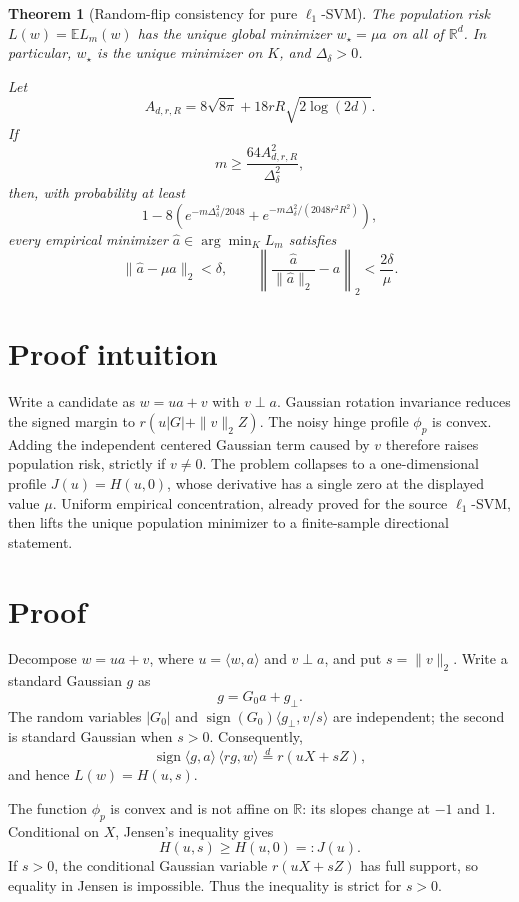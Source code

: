 \documentclass[11pt]{article}
\newtheorem{theorem}{Theorem}
\newcommand{\R}{\mathbb R}
\newcommand{\E}{\mathbb E}
\begin{document}
\begin{theorem}[Random-flip consistency for pure $\ell_1$-SVM]
The population risk $L(w)=\E L_m(w)$ has the unique global minimizer
$w_\star=\mu a$ on all of $\R^d$. In particular, $w_\star$ is the unique
minimizer on $K$, and $\Delta_\delta>0$.

Let
\[
 A_{d,r,R}=8\sqrt{8\pi}+18rR\sqrt{2\log(2d)}.
\]
If
\[
 m\geq \frac{64A_{d,r,R}^2}{\Delta_\delta^2},
\]
then, with probability at least
\[
 1-8\left(
 e^{-m\Delta_\delta^2/2048}
 +e^{-m\Delta_\delta^2/(2048r^2R^2)}
 \right),
\]
every empirical minimizer $\widehat a\in\arg\min_K L_m$ satisfies
\[
 \|\widehat a-\mu a\|_2<\delta,
 \qquad
 \left\|\frac{\widehat a}{\|\widehat a\|_2}-a\right\|_2
 <\frac{2\delta}{\mu}.
\]
\end{theorem}

\section{Proof intuition}

Write a candidate as $w=ua+v$ with $v\perp a$. Gaussian rotation invariance
reduces the signed margin to $r(u|G|+\|v\|_2Z)$. The noisy hinge profile
$\phi_p$ is convex. Adding the independent centered Gaussian term caused by
$v$ therefore raises population risk, strictly if $v\neq0$. The problem
collapses to a one-dimensional profile $J(u)=H(u,0)$, whose derivative has a
single zero at the displayed value $\mu$. Uniform empirical concentration,
already proved for the source $\ell_1$-SVM, then lifts the unique population
minimizer to a finite-sample directional statement.

\section{Proof}

Decompose $w=ua+v$, where $u=\langle w,a\rangle$ and $v\perp a$, and put
$s=\|v\|_2$. Write a standard Gaussian $g$ as
\[
 g=G_0a+g_\perp.
\]
The random variables $|G_0|$ and
$\operatorname{sign}(G_0)\langle g_\perp,v/s\rangle$ are independent; the
second is standard Gaussian when $s>0$. Consequently,
\[
 \operatorname{sign}\langle g,a\rangle\,\langle rg,w\rangle
 \stackrel{d}{=}r(uX+sZ),
\]
and hence $L(w)=H(u,s)$.

The function $\phi_p$ is convex and is not affine on $\R$: its slopes change
at $-1$ and $1$. Conditional on $X$, Jensen's inequality gives
\[
 H(u,s)\geq H(u,0)=:J(u).
\]
If $s>0$, the conditional Gaussian variable $r(uX+sZ)$ has full support, so
equality in Jensen is impossible. Thus the inequality is strict for $s>0$.
\end{document}
